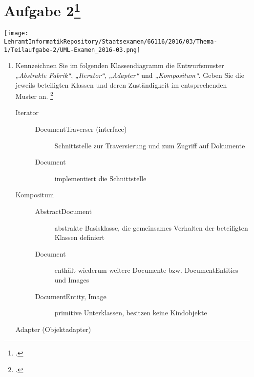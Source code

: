 \documentclass{lehramt-informatik-minimal}
\begin{document}
\section{Aufgabe 2\footcite{sosy:ab:6}}

\texttt{[image: \\LehramtInformatikRepository/Staatsexamen/66116/2016/03/Thema-1/Teilaufgabe-2/UML-Examen\_2016-03.png]}

\begin{enumerate}


\item Kennzeichnen Sie im folgenden Klassendiagramm die Entwurfsmuster
\emph{„Abstrakte Fabrik“}, \emph{„Iterator“}, \emph{„Adapter“} und
\emph{„Kompositum“}. Geben Sie die jeweils beteiligten Klassen und deren
Zuständigkeit im entsprechenden Muster an.
\footcite[StEx F16, T1, Teilaufgabe 2 A2 (abgeändert)]{examen:66116:2016:03}

\begin{antwort}

\begin{description}

%

\item[Iterator] \strut

\begin{description}
\item[DocumentTraverser (interface)]
Schnittstelle zur Traversierung und zum Zugriff auf Dokumente

\item[Document]
implementiert die Schnittstelle
\end{description}

%

\item[Kompositum] \strut

\begin{description}
\item[AbstractDocument]
abstrakte Basisklasse, die gemeinsames Verhalten der beteiligten
Klassen definiert

\item[Document]
enthält wiederum weitere Documente bzw. DocumentEntities und Images

\item[DocumentEntity, Image]
primitive Unterklassen, besitzen keine Kindobjekte
\end{description}

%

\item[Adapter (Objektadapter)] \strut


\end{description}
\end{antwort}
\end{enumerate}
\end{document}
